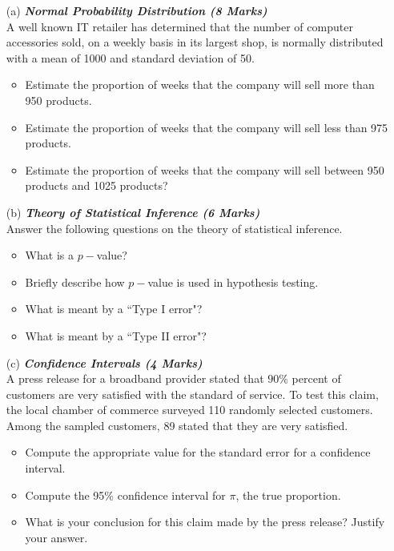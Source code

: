 \begin{itemize}
\item[(a)] \textbf{\textit{Normal Probability Distribution (8 Marks)}}\\
A well known IT retailer has determined that the number of computer accessories sold, on a weekly basis in its largest shop, is normally distributed with a mean of 1000 and standard deviation of 50.
\begin{itemize}
\item  Estimate the proportion of weeks that the company will sell more than 950 products.

\item  Estimate the proportion of weeks that the company will sell less than 975 products.
\item  Estimate the proportion of weeks that the company will sell between 950
products and 1025 products?
\end{itemize}

\item[(b)] \textbf{\textit{Theory of Statistical Inference (6 Marks)}}\\Answer the following questions on the theory of statistical inference.
\begin{itemize}
\item  What is a $p-$value?
\item  Briefly describe how $p-$value is used in hypothesis testing.
\item  What is meant by a ``Type I error"?
\item   What is meant by a ``Type II error"?
\end{itemize}
\bigskip

\item[(c)] \textbf{\textit{Confidence Intervals (4 Marks)}}\\
A press release for a broadband provider stated that $90\%$ percent of customers are very satisfied
with the standard of service. To test this claim, the local chamber of commerce surveyed 110 randomly selected customers. Among the sampled customers, 89 stated that they are very satisfied.





\begin{itemize}
\item  Compute the appropriate value for the standard error for a confidence interval.
\item  Compute the 95\% confidence interval for $\pi$, the true proportion.
\item  What is your conclusion for this claim made by the press release? Justify your answer.
\end{itemize}
\end{itemize}
